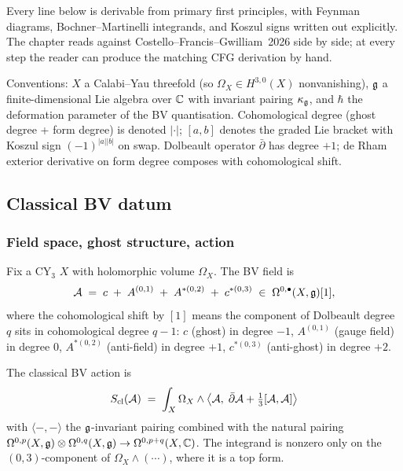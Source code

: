 Every line below is derivable from primary first principles, with
Feynman diagrams, Bochner--Martinelli integrands, and Koszul signs
written out explicitly. The chapter reads against
Costello--Francis--Gwilliam~2026 side by side; at every step the reader
can produce the matching CFG derivation by hand.

Conventions: $X$ a Calabi--Yau threefold (so $\Omega_X \in H^{3,0}(X)$
nonvanishing), $\mathfrak{g}$ a finite-dimensional Lie algebra over $\mathbb{C}$ with
invariant pairing $\kappa_{\mathfrak{g}}$, and $\hbar$ the deformation parameter
of the BV quantisation. Cohomological degree (ghost degree + form
degree) is denoted $|\cdot|$; $[a,b]$ denotes the graded Lie bracket
with Koszul sign $(-1)^{|a||b|}$ on swap. Dolbeault operator
$\bar\partial$ has degree $+1$; de Rham exterior derivative on form
degree composes with cohomological shift.


\subsection{Classical BV datum}
\label{opus13:subsec:classical}

\subsubsection{Field space, ghost structure, action}

\begin{definition}\ClaimStatusDefinition
\label{opus13:def:bv-field}
Fix a CY$_3$ $X$ with holomorphic volume $\Omega_X$. The BV field is
\[
  \mathcal{A} \;=\; c \;+\; A^{(0,1)} \;+\; A^{*(0,2)} \;+\; c^{*(0,3)} \;\in\;
  \Omega^{0,\bullet}(X, \mathfrak{g})[1],
\]
where the cohomological shift by $[1]$ means the component of Dolbeault
degree $q$ sits in cohomological degree $q - 1$: $c$ (ghost) in degree
$-1$, $A^{(0,1)}$ (gauge field) in degree $0$, $A^{*(0,2)}$ (anti-field)
in degree $+1$, $c^{*(0,3)}$ (anti-ghost) in degree $+2$.
\end{definition}

\begin{proposition}\ClaimStatusProposition
\label{opus13:prop:cl-action}
The classical BV action is
\begin{equation}
  S_{\mathrm{cl}}(\mathcal{A}) \;=\; \int_X \Omega_X \wedge
  \bigl\langle \mathcal{A},\; \bar\partial \mathcal{A} + \tfrac{1}{3}[\mathcal{A}, \mathcal{A}]\bigr\rangle
  \label{opus13:eq:S-cl}
\end{equation}
with $\langle-,-\rangle$ the $\mathfrak{g}$-invariant pairing combined with the
natural pairing $\Omega^{0,p}(X,\mathfrak{g}) \otimes \Omega^{0,q}(X,\mathfrak{g})\to
\Omega^{0,p+q}(X,\mathbb{C})$. The integrand is nonzero only on the
$(0,3)$-component of $\Omega_X \wedge (\cdots)$, where it is a top form.
\end{proposition}

